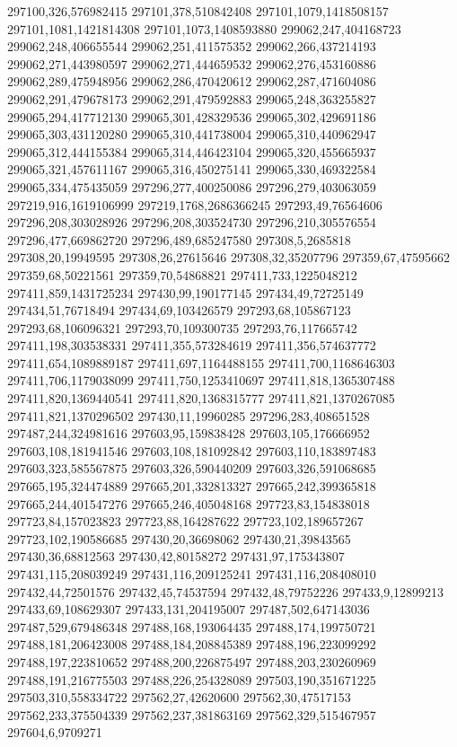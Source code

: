 297100,326,576982415
297101,378,510842408
297101,1079,1418508157
297101,1081,1421814308
297101,1073,1408593880
299062,247,404168723
299062,248,406655544
299062,251,411575352
299062,266,437214193
299062,271,443980597
299062,271,444659532
299062,276,453160886
299062,289,475948956
299062,286,470420612
299062,287,471604086
299062,291,479678173
299062,291,479592883
299065,248,363255827
299065,294,417712130
299065,301,428329536
299065,302,429691186
299065,303,431120280
299065,310,441738004
299065,310,440962947
299065,312,444155384
299065,314,446423104
299065,320,455665937
299065,321,457611167
299065,316,450275141
299065,330,469322584
299065,334,475435059
297296,277,400250086
297296,279,403063059
297219,916,1619106999
297219,1768,2686366245
297293,49,76564606
297296,208,303028926
297296,208,303524730
297296,210,305576554
297296,477,669862720
297296,489,685247580
297308,5,2685818
297308,20,19949595
297308,26,27615646
297308,32,35207796
297359,67,47595662
297359,68,50221561
297359,70,54868821
297411,733,1225048212
297411,859,1431725234
297430,99,190177145
297434,49,72725149
297434,51,76718494
297434,69,103426579
297293,68,105867123
297293,68,106096321
297293,70,109300735
297293,76,117665742
297411,198,303538331
297411,355,573284619
297411,356,574637772
297411,654,1089889187
297411,697,1164488155
297411,700,1168646303
297411,706,1179038099
297411,750,1253410697
297411,818,1365307488
297411,820,1369440541
297411,820,1368315777
297411,821,1370267085
297411,821,1370296502
297430,11,19960285
297296,283,408651528
297487,244,324981616
297603,95,159838428
297603,105,176666952
297603,108,181941546
297603,108,181092842
297603,110,183897483
297603,323,585567875
297603,326,590440209
297603,326,591068685
297665,195,324474889
297665,201,332813327
297665,242,399365818
297665,244,401547276
297665,246,405048168
297723,83,154838018
297723,84,157023823
297723,88,164287622
297723,102,189657267
297723,102,190586685
297430,20,36698062
297430,21,39843565
297430,36,68812563
297430,42,80158272
297431,97,175343807
297431,115,208039249
297431,116,209125241
297431,116,208408010
297432,44,72501576
297432,45,74537594
297432,48,79752226
297433,9,12899213
297433,69,108629307
297433,131,204195007
297487,502,647143036
297487,529,679486348
297488,168,193064435
297488,174,199750721
297488,181,206423008
297488,184,208845389
297488,196,223099292
297488,197,223810652
297488,200,226875497
297488,203,230260969
297488,191,216775503
297488,226,254328089
297503,190,351671225
297503,310,558334722
297562,27,42620600
297562,30,47517153
297562,233,375504339
297562,237,381863169
297562,329,515467957
297604,6,9709271
